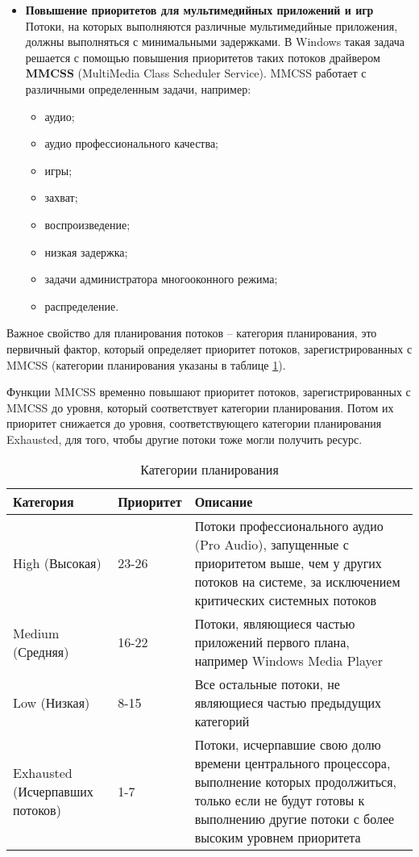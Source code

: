 \documentclass[a4paper,14pt,russian]{extreport}
\begin{document}
\begin{itemize}
		\item \textbf{Повышение приоритетов для мультимедийных приложений и игр}
		Потоки, на которых выполняются различные мультимедийные приложения, должны выполняться с минимальными задержками.
		В Windows такая задача решается с помощью повышения приоритетов таких потоков драйвером \textbf{MMCSS} (MultiMedia Class Scheduler Service).
		MMCSS работает с различными определенным задачи, например:
		\begin{itemize}
			\item аудио;
			\item аудио профессионального качества;
			\item игры;
			\item захват;
			\item воспроизведение;
			\item низкая задержка;
			\item задачи администратора многооконного режима;
			\item распределение.
		\end{itemize}
	\end{itemize}

	Важное свойство для планирования потоков – категория планирования, это первичный фактор, который определяет приоритет потоков, зарегистрированных с MMCSS (категории планирования указаны в таблице \ref{tab:plan}).
	
	Функции MMCSS временно повышают приоритет потоков, зарегистрированных с MMCSS до уровня, который соответствует категории планирования.
	Потом их приоритет снижается до уровня, соответствующего категории планирования Exhausted, для того, чтобы другие потоки тоже могли получить ресурс.
	
	\begin{table}[h]
		\caption{Категории планирования}
		\begin{center}
			\begin{tabular}{|p{40mm}|p{30mm}|p{80mm}|}
				\hline
				\textbf{Категория} & \textbf{Приоритет} & \textbf{Описание} \\
				\hline
				High (Высокая) & 23-26 & Потоки профессионального аудио (Pro Audio), запущенные с приоритетом выше, чем у других потоков на системе, за исключением критических системных потоков \\
				\hline
				Medium (Средняя) & 16-22 & Потоки, являющиеся частью приложений первого плана, например Windows Media Player \\
				\hline
				Low (Низкая) & 8-15 & Все остальные потоки, не являющиеся частью предыдущих категорий \\
				\hline
				Exhausted (Исчерпавших потоков) & 1-7 & Потоки, исчерпавшие свою долю времени центрального процессора, выполнение которых продолжиться, только если не будут готовы к выполнению другие потоки с более высоким уровнем приоритета \\
				\hline
			\end{tabular}
		\end{center}
		\label{tab:plan}
	\end{table}
\end{document}
